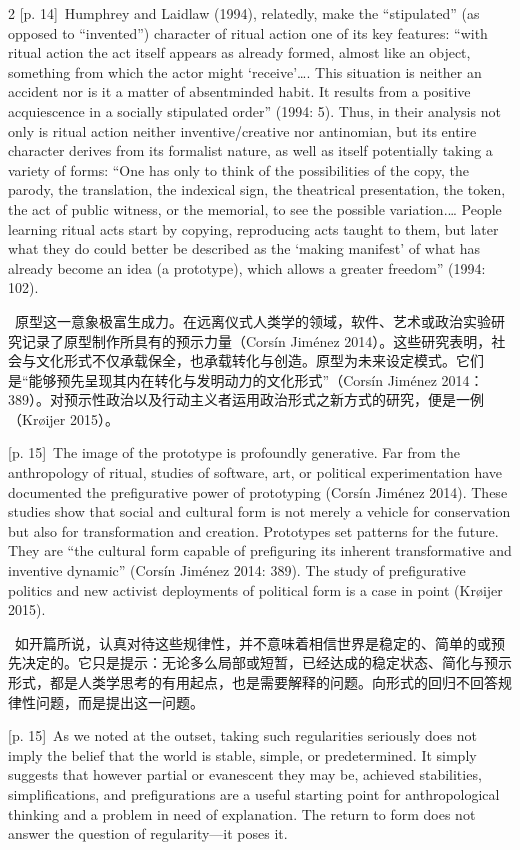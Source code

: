 \documentclass[10pt,a4paper]{article}
\begin{document}
\begin{paracol}{2}
\switchcolumn
{\scriptsize\color{gray} [p. 14]}\ Humphrey and Laidlaw (1994), relatedly, make the “stipulated” (as opposed to “invented”) character of ritual action one of its key features: “with ritual action the act itself appears as already formed, almost like an object, something from which the actor might ‘receive’…. This situation is neither an accident nor is it a matter of absentminded habit. It results from a positive acquiescence in a socially stipulated order” (1994: 5). Thus, in their analysis not only is ritual action neither inventive/creative nor antinomian, but its entire character derives from its formalist nature, as well as itself potentially taking a variety of forms: “One has only to think of the possibilities of the copy, the parody, the translation, the indexical sign, the theatrical presentation, the token, the act of public witness, or the memorial, to see the possible variation.… People learning ritual acts start by copying, reproducing acts taught to them, but later what they do could better be described as the ‘making manifest’ of what has already become an idea (a prototype), which allows a greater freedom” (1994: 102).\par
\switchcolumn*
{\scriptsize\color{gray} [p. 15]}\ 原型这一意象极富生成力。在远离仪式人类学的领域，软件、艺术或政治实验研究记录了原型制作所具有的预示力量（Corsín Jiménez 2014）。这些研究表明，社会与文化形式不仅承载保全，也承载转化与创造。原型为未来设定模式。它们是“能够预先呈现其内在转化与发明动力的文化形式”（Corsín Jiménez 2014：389）。对预示性政治以及行动主义者运用政治形式之新方式的研究，便是一例（Krøijer 2015）。\par
\switchcolumn
{\scriptsize\color{gray} [p. 15]}\ The image of the prototype is profoundly generative. Far from the anthropology of ritual, studies of software, art, or political experimentation have documented the prefigurative power of prototyping (Corsín Jiménez 2014). These studies show that social and cultural form is not merely a vehicle for conservation but also for transformation and creation. Prototypes set patterns for the future. They are “the cultural form capable of prefiguring its inherent transformative and inventive dynamic” (Corsín Jiménez 2014: 389). The study of prefigurative politics and new activist deployments of political form is a case in point (Krøijer 2015).\par
\switchcolumn*
{\scriptsize\color{gray} [p. 15]}\ 如开篇所说，认真对待这些规律性，并不意味着相信世界是稳定的、简单的或预先决定的。它只是提示：无论多么局部或短暂，已经达成的稳定状态、简化与预示形式，都是人类学思考的有用起点，也是需要解释的问题。向形式的回归不回答规律性问题，而是提出这一问题。\par
\switchcolumn
{\scriptsize\color{gray} [p. 15]}\ As we noted at the outset, taking such regularities seriously does not imply the belief that the world is stable, simple, or predetermined. It simply suggests that however partial or evanescent they may be, achieved stabilities, simplifications, and prefigurations are a useful starting point for anthropological thinking and a problem in need of explanation. The return to form does not answer the question of regularity—it poses it.\par
\switchcolumn*
\end{paracol}
\end{document}
